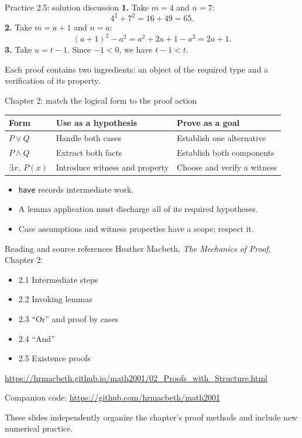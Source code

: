 \begin{frame}{Practice 2.5: solution discussion}
\textbf{1.} Take $m=4$ and $n=7$:
\[
4^2+7^2=16+49=65.
\]
\textbf{2.} Take $m=a+1$ and $n=a$:
\[
(a+1)^2-a^2=a^2+2a+1-a^2=2a+1.
\]
\textbf{3.} Take $u=t-1$. Since $-1<0$, we have $t-1<t$.
\medskip

Each proof contains two ingredients: an object of the required type and a verification of its property.
\end{frame}

\begin{frame}{Chapter 2: match the logical form to the proof action}
\begin{center}
\begin{tabular}{lll}
\toprule
Form & Use as a hypothesis & Prove as a goal \\
\midrule
$P\lor Q$ & Handle both cases & Establish one alternative \\
$P\land Q$ & Extract both facts & Establish both components \\
$\exists x,\ P(x)$ & Introduce witness and property & Choose and verify a witness \\
\bottomrule
\end{tabular}
\end{center}
\begin{itemize}
\item \texttt{have} records intermediate work.
\item A lemma application must discharge all of its required hypotheses.
\item Case assumptions and witness properties have a scope; respect it.
\end{itemize}
\end{frame}

\begin{frame}{Reading and source references}
Heather Macbeth, \emph{The Mechanics of Proof}, Chapter 2:
\begin{itemize}
\item 2.1 Intermediate steps
\item 2.2 Invoking lemmas
\item 2.3 ``Or'' and proof by cases
\item 2.4 ``And''
\item 2.5 Existence proofs
\end{itemize}
\small
\url{https://hrmacbeth.github.io/math2001/02_Proofs_with_Structure.html}
\par\medskip
Companion code: \url{https://github.com/hrmacbeth/math2001}
\par\medskip
These slides independently organize the chapter's proof methods and include new numerical practice.
\end{frame}

